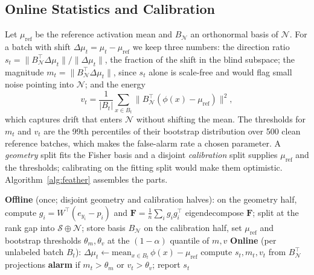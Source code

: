 \documentclass[conference]{IEEEtran}
\newcommand{\F}{\mathbf{F}}
\newcommand{\act}{\phi}
\begin{document}
\subsection{Online Statistics and Calibration}
\label{sec:stats}

Let $\mu_{\mathrm{ref}}$ be the reference activation mean and $B_\mathcal{N}$
an orthonormal basis of $\mathcal{N}$. For a batch with shift
$\Delta\mu_t = \mu_t - \mu_{\mathrm{ref}}$ we keep three numbers: the
direction ratio
$s_t = \lVert B_\mathcal{N}^\top \Delta\mu_t\rVert / \lVert \Delta\mu_t\rVert$,
the fraction of the shift in the blind subspace; the magnitude
$m_t = \lVert B_\mathcal{N}^\top \Delta\mu_t\rVert$, since $s_t$ alone is
scale-free and would flag small noise pointing into $\mathcal{N}$; and the
energy
\begin{equation}
  v_t = \frac{1}{|B_t|}\sum_{x \in B_t}
        \big\lVert B_\mathcal{N}^\top(\act(x) - \mu_{\mathrm{ref}})\big\rVert^2,
\end{equation}
which captures drift that enters $\mathcal{N}$ without shifting the mean. The
thresholds for $m_t$ and $v_t$ are the 99th percentiles of their bootstrap
distribution over 500 clean reference batches, which makes the false-alarm
rate a chosen parameter. A \emph{geometry} split fits the Fisher basis and a
disjoint \emph{calibration} split supplies $\mu_{\mathrm{ref}}$ and the
thresholds; calibrating on the fitting split would make them optimistic.
Algorithm~\ref{alg:feather} assembles the parts.

\begin{algorithm}[t]
\caption{FEATHER}
\label{alg:feather}
\begin{algorithmic}[1]
\Statex \textbf{Offline} (once; disjoint geometry and calibration halves):
\State on the geometry half, compute $g_i = W^\top(e_{y_i} - p_i)$ and
       $\F = \frac{1}{n}\sum_i g_i g_i^\top$
\State eigendecompose $\F$; split at the rank gap into
       $\mathcal{S} \oplus \mathcal{N}$; store basis $B_\mathcal{N}$
\State on the calibration half, set $\mu_{\mathrm{ref}}$ and bootstrap
       thresholds $\theta_m, \theta_v$ at the $(1-\alpha)$ quantile of $m, v$
\Statex \textbf{Online} (per unlabeled batch $B_t$):
\State $\Delta\mu_t \gets \mathrm{mean}_{x \in B_t}\,\act(x) - \mu_{\mathrm{ref}}$
\State compute $s_t, m_t, v_t$ from $B_\mathcal{N}^\top$ projections
\State \textbf{alarm} if $m_t > \theta_m$ or $v_t > \theta_v$; report $s_t$
\end{algorithmic}
\end{algorithm}
\end{document}
